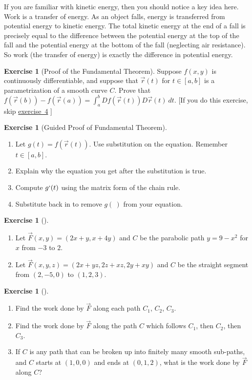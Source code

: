 \documentclass[10pt,]{book}
\theoremstyle{plain}
\theoremstyle{definition}
\theoremstyle{definition}
\theoremstyle{definition}
\theoremstyle{definition}
\newtheorem{exploration}[project]{Exercise}
\theoremstyle{definition}
\numberwithin{equation}{section}
\begin{document}
If you are familiar with kinetic energy, then you should notice a key idea here. Work is a transfer of energy. As an object falls, energy is transferred from potential energy to kinetic energy. The total kinetic energy at the end of a fall is precisely equal to the difference between the potential energy at the top of the fall and the potential energy at the bottom of the fall (neglecting air resistance). So work (the transfer of energy) is exactly the difference in potential energy.%
\begin{exploration}[Proof of the Fundamental Theorem]\label{exploration-205}
Suppose \(f(x,y)\) is continuously differentiable, and suppose that \(\vec r(t)\) for \(t\in[a,b]\) is a parametrization of a smooth curve \(C\). Prove that \(f(\vec r(b))-f(\vec r(a)) = \int_a^b Df(\vec r(t))D\vec r(t)\ dt\). [If you do this exercise, skip \hyperref[prob_proof_of_fundamental_thm2]{exercise~4} ]%
\end{exploration}
\begin{exploration}[Guided Proof of Fundamental Theorem]\label{prob_proof_of_fundamental_thm2}
\leavevmode%
\begin{enumerate}[font=\bfseries,label=(\alph*),ref=\alph*]
\item\label{task-530} Let \(g(t) = f(\vec r(t))\). Use substitution on the equation. Remember \(t \in [a,b]\).%
\item\label{task-531} Explain why the equation you get after the substitution is true.%
\item\label{task-532} Compute \(g`(t)\) using the matrix form of the chain rule.%
\item\label{task-533} Substitute back in to remove \(g(\ )\) from your equation.%
\end{enumerate}
\end{exploration}
\begin{exploration}[]\label{exploration-207}
\leavevmode%
\begin{enumerate}[font=\bfseries,label=(\alph*),ref=\alph*]
\item\label{task-534} Let \(\vec F(x,y) = (2x+y,x+4y)\) and \(C\) be the parabolic path \(y=9-x^2\) for \(x\) from \(-3\) to \(2\).%
\item\label{task-535} Let \(\vec F(x,y,z) = (2x+yz,2z+xz,2y+xy)\) and \(C\) be the straight segment from \((2,-5,0)\) to \((1,2,3)\).%
\end{enumerate}
\end{exploration}
\begin{exploration}[]\label{exploration-208}
\leavevmode%
\begin{enumerate}[font=\bfseries,label=(\alph*),ref=\alph*]
\item\label{task-536} Find the work done by \(\vec F\) along each path \(C_1\), \(C_2\), \(C_3\).  %
\item\label{task-537} Find the work done by \(\vec F\) along the path \(C\) which follows \(C_1\), then \(C_2\), then \(C_3\).%
\item\label{task-538} If \(C\) is any path that can be broken up into finitely many smooth sub-paths, and \(C\) starts at \((1,0,0)\) and ends at \((0,1,2)\), what is the work done by \(\vec F\) along \(C\)?%
\end{enumerate}
\end{exploration}
\end{document}
